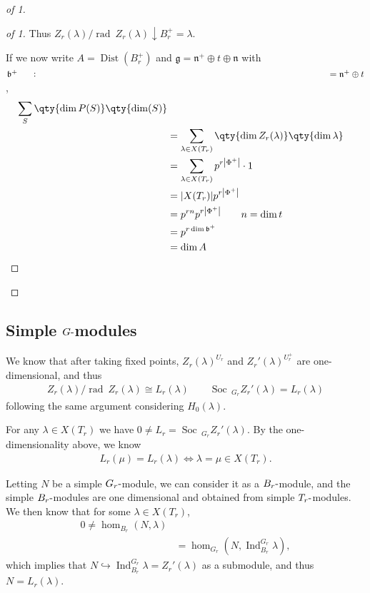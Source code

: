 \begin{proof}[of 1]
\begin{proof}[of 1]
Thus
\(Z_r(\lambda) / {\operatorname{rad}~}Z_r(\lambda) \downarrow{B_r^+} = \lambda\).

If we now write \(A= \operatorname{Dist}(B_r^+)\) and
\({\mathfrak{g}}= {\mathfrak{n}}^+ \oplus t \oplus {\mathfrak{n}}\) with
\({\mathfrak{b}}^+ \mathrel{\vcenter{:}}={\mathfrak{n}}^+ \oplus t\),
\begin{align*} \sum_S \qty{\dim P(S)} \qty{\dim(S)} \\ &= \sum_{\lambda \in X(T_r)} \qty{\dim Z_r(\lambda)} \qty{\dim \lambda} \\ &= \sum_{\lambda \in X(T_r)} p^{r{\left\lvert {\Phi^+} \right\rvert}} \cdot 1 \\ &= {\left\lvert {X(T_r)} \right\rvert} p^{r{\left\lvert {\Phi^+} \right\rvert}} \\ &= p^{rn} p^{r{\left\lvert {\Phi^+} \right\rvert}} \qquad n = \dim t\\ &= p^{r \dim {\mathfrak{b}}^+} \\ &= \dim A \end{align*}

\end{proof}

\end{proof}

\hypertarget{simple-ghbox-modules}{%
\subsection{\texorpdfstring{Simple
\(G{\hbox{-}}\)modules}{Simple G\{\textbackslash hbox\{-\}\}modules}}\label{simple-ghbox-modules}}

We know that after taking fixed points, \(Z_r(\lambda)^{U_r}\) and
\(Z_r'(\lambda)^{U_r^+}\) are one-dimensional, and thus
\begin{align*}   Z_r(\lambda) / {\operatorname{rad}~}Z_r(\lambda) \cong L_r(\lambda) \qquad \operatorname{Soc}\,_{G_r} Z_r'(\lambda) = L_r(\lambda) \end{align*}
following the same argument considering \(H_0(\lambda)\).

For any \(\lambda \in X(T_r)\) we have
\(0\neq L_r = \operatorname{Soc}\,_{G_r} Z_r'(\lambda)\). By the
one-dimensionality above, we know
\begin{align*}   L_r(\mu) = L_r(\lambda) \iff \lambda = \mu \in X(T_r) .\end{align*}

Letting \(N\) be a simple \(G_r{\hbox{-}}\)module, we can consider it as
a \(B_r{\hbox{-}}\)module, and the simple \(B_r{\hbox{-}}\)modules are
one dimensional and obtained from simple \(T_r{\hbox{-}}\)modules. We
then know that for some \(\lambda \in X(T_r)\),
\begin{align*}   0 \neq \hom_{B_r}(N, \lambda) \\ &= \hom_{G_r}(N, \operatorname{Ind}_{B_r}^{G_r} \lambda) ,\end{align*}
which implies that
\(N\hookrightarrow\operatorname{Ind}_{B_r}^{G_r} \lambda = Z_r'(\lambda)\)
as a submodule, and thus \(N = L_r(\lambda)\).

